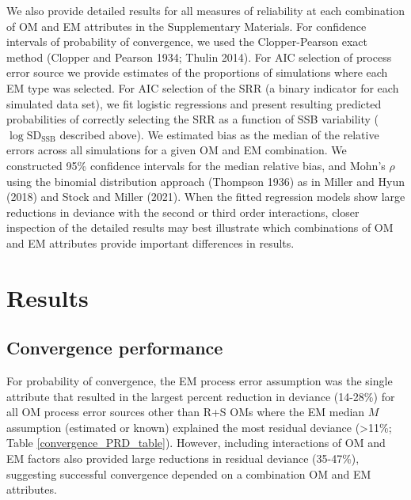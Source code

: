 \documentclass[
  12pt,
]{article}
\begin{document}
We also provide detailed results for all measures of reliability at each
combination of OM and EM attributes in the Supplementary Materials. For
confidence intervals of probability of convergence, we used the
Clopper-Pearson exact method (Clopper and Pearson 1934; Thulin 2014).
For AIC selection of process error source we provide estimates of the
proportions of simulations where each EM type was selected. For AIC
selection of the SRR (a binary indicator for each simulated data set),
we fit logistic regressions and present resulting predicted
probabilities of correctly selecting the SRR as a function of SSB
variability (\(\log \text{SD}_{\text{SSB}}\) described above). We
estimated bias as the median of the relative errors across all
simulations for a given OM and EM combination. We constructed 95\%
confidence intervals for the median relative bias, and Mohn's \(\rho\)
using the binomial distribution approach (Thompson 1936) as in Miller
and Hyun (2018) and Stock and Miller (2021). When the fitted regression
models show large reductions in deviance with the second or third order
interactions, closer inspection of the detailed results may best
illustrate which combinations of OM and EM attributes provide important
differences in results.

\section*{Results}\label{results}

\subsection*{Convergence performance}\label{convergence-performance}

For probability of convergence, the EM process error assumption was the
single attribute that resulted in the largest percent reduction in
deviance (14-28\%) for all OM process error sources other than R+S OMs
where the EM median \(M\) assumption (estimated or known) explained the
most residual deviance (\textgreater11\%; Table
\ref{convergence_PRD_table}). However, including interactions of OM and
EM factors also provided large reductions in residual deviance
(35-47\%), suggesting successful convergence depended on a combination
OM and EM attributes.
\end{document}
